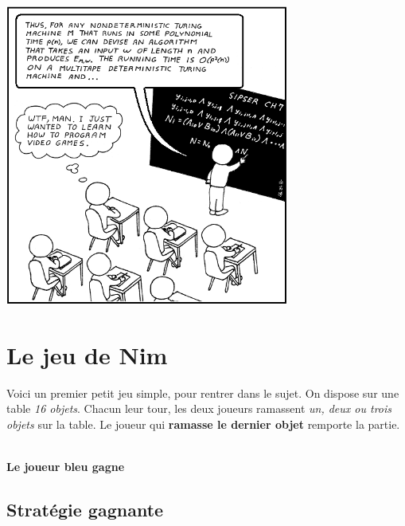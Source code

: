 \documentclass[a5paper,pagesize,DIV=14]{scrbook}
\begin{document}
\begin{center}
  \includegraphics[width=0.7\textwidth]{img/computer_science_major.PNG}
  \label{img:CSmajor}
\end{center}

\chapter*{Le jeu de Nim}

Voici un premier petit jeu simple, pour rentrer dans le sujet. On dispose sur une table \textit{16 objets}. Chacun leur tour, les deux joueurs ramassent \textit{un, deux ou trois objets} sur la table. Le joueur qui \textbf{ramasse le dernier objet} remporte la partie.

\bigskip
 

\bigskip
\bigskip
\bigskip

\begin{center}
 \\
\textbf{Le joueur bleu gagne}
\end{center}

\newpage

\section*{Stratégie gagnante}
\end{document}
